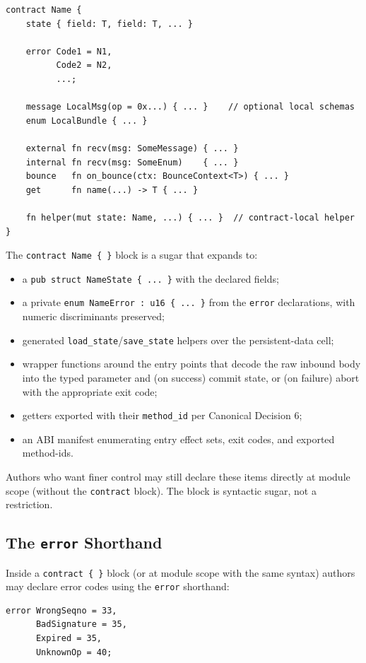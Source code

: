 \documentclass[12pt,oneside]{article}
\begin{document}
\begin{verbatim}
contract Name {
    state { field: T, field: T, ... }

    error Code1 = N1,
          Code2 = N2,
          ...;

    message LocalMsg(op = 0x...) { ... }    // optional local schemas
    enum LocalBundle { ... }

    external fn recv(msg: SomeMessage) { ... }
    internal fn recv(msg: SomeEnum)    { ... }
    bounce   fn on_bounce(ctx: BounceContext<T>) { ... }
    get      fn name(...) -> T { ... }

    fn helper(mut state: Name, ...) { ... }  // contract-local helper
}
\end{verbatim}

The \verb|contract Name { }| block is a sugar that expands to:

\begin{itemize}
\item a \verb|pub struct NameState { ... }| with the declared fields;
\item a private \verb|enum NameError : u16 { ... }| from the
\verb|error| declarations, with numeric discriminants preserved;
\item generated \verb|load_state|/\verb|save_state| helpers over the
persistent-data cell;
\item wrapper functions around the entry points that decode the raw
inbound body into the typed parameter and (on
success) commit state, or (on failure) abort with the appropriate exit
code;
\item getters exported with their \verb|method_id| per Canonical
Decision 6;
\item an ABI manifest enumerating entry effect sets, exit codes, and
exported method-ids.
\end{itemize}

Authors who want finer control may still declare these items directly
at module scope (without the \verb|contract| block). The block is
syntactic sugar, not a restriction.

\subsection{The \texttt{error} Shorthand}
\label{sec:error-shorthand}
Inside a \verb|contract { }| block (or at module scope with the same
syntax) authors may declare error codes using the \verb|error|
shorthand:

\begin{verbatim}
error WrongSeqno = 33,
      BadSignature = 35,
      Expired = 35,
      UnknownOp = 40;
\end{verbatim}
\end{document}
